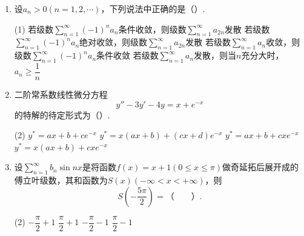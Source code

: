 \documentclass[../Main.tex]{subfiles}
\begin{document}
\begin{enumerate}
          \begin{tasks}[label=\textbf{\Alph*.}, label-width=1.5em, column-sep=1em](2)
              \task $\dfrac{\pi R^{4}}{4}$
              \task $-\dfrac{\pi R^{4}}{2}$
              \task $-\pi R^{4}$
              \task $\dfrac{\pi R^{4}}{2}$
          \end{tasks}
          \vspace{1em}

    \item 设$a_{n}>0(n=1,2,\cdots)$，下列说法中正确的是（\qquad）.

          \begin{tasks}[label=\textbf{\Alph*.}, label-width=1.5em, column-sep=1em](1)
              \task 若级数$\sum\limits_{n=1}^{\infty}(-1)^{n}a_{n}$条件收敛，则级数$\sum\limits_{n=1}^{\infty}a_{2n}$发散
              \task 若级数$\sum\limits_{n=1}^{\infty}(-1)^{n}a_{n}$绝对收敛，则级数$\sum\limits_{n=1}^{\infty}a_{2n}$发散
              \task 若级数$\sum\limits_{n=1}^{\infty}a_{n}$收敛，则级数$\sum\limits_{n=1}^{\infty}(-1)^{n}a_{n}$条件收敛
              \task 若级数$\sum\limits_{n=1}^{\infty}a_{n}$发散，则当$n$充分大时，$a_{n}\geq \dfrac1n$
          \end{tasks}
          \vspace{1em}

    \item 二阶常系数线性微分方程
          \[
              y''-3y'-4y=x+e^{-x}
          \]
          的特解的待定形式为（\qquad）.

          \begin{tasks}[label=\textbf{\Alph*.}, label-width=1.5em, column-sep=1em](2)
              \task $y^{*}=ax+b+ce^{-x}$
              \task $y^{*}=x(ax+b)+(cx+d)e^{-x}$
              \task $y^{*}=ax+b+cxe^{-x}$
              \task $y^{*}=x(ax+b)+cxe^{-x}$
          \end{tasks}
          \vspace{1em}

    \item 设$\sum\limits_{n=1}^{\infty}b_{n}\sin nx$是将函数$f(x)=x+1(0\leq x\leq\pi)$做奇延拓后展开成的傅立叶级数，其和函数为$S(x)(-\infty<x<+\infty)$，则
          \[
              S\left(-\frac{5\pi}{2}\right)=（\qquad）.
          \]

          \begin{tasks}[label=\textbf{\Alph*.}, label-width=1.5em, column-sep=1em](2)
              \task $-\dfrac{\pi}{2}+1$
              \task $\dfrac{\pi}{2}+1$
              \task $-\dfrac{\pi}{2}-1$
              \task $\dfrac{\pi}{2}-1$
          \end{tasks}
          \vspace{1em}
\end{enumerate}
\end{document}
